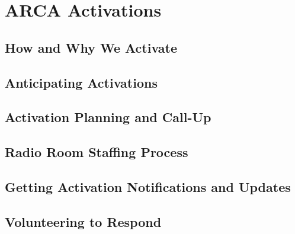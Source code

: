 \documentclass[pdflatex,letterpaper,twoside,12pt]{book}
\begin{document}
\chapter{ARCA Activations}

\section{How and Why We Activate}


\section{Anticipating Activations}


\section{Activation Planning and Call-Up}


\section{Radio Room Staffing Process}


\section{Getting Activation Notifications and Updates}


\section{Volunteering to Respond}
\end{document}
